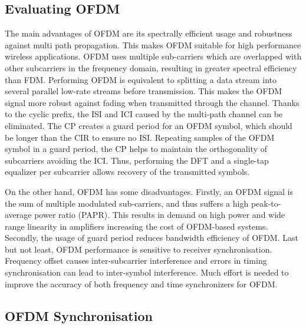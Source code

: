 \subsection{Evaluating OFDM}

The main advantages of OFDM are its spectrally efficient usage and robustness against multi path propagation.
This makes OFDM suitable for high performance wireless applications.
OFDM uses multiple sub-carriers which are overlapped with other subcarriers in the frequency domain, resulting in greater spectral efficiency than FDM.
Performing OFDM is equivalent to splitting a data stream into several parallel low-rate streams before transmission.
This makes the OFDM signal more robust against fading when transmitted through the channel.
Thanks to the cyclic prefix, the ISI and ICI caused by the multi-path channel can be eliminated.
The CP creates a guard period for an OFDM symbol, which should be longer than the CIR to ensure no ISI.
Repeating samples of the OFDM symbol in a guard period, the CP helps to maintain the orthogonality of subcarriers avoiding the ICI.
Thus, performing the DFT and a single-tap equalizer per subcarrier allows recovery of the transmitted symbols.

On the other hand, OFDM has some disadvantages.
Firstly, an OFDM signal is the sum of multiple modulated sub-carriers, and thus suffers a high peak-to-average power ratio (PAPR).
This results in demand on high power and wide range linearity in amplifiers increasing the cost of OFDM-based systems.
Secondly, the usage of guard period reduces bandwidth efficiency of OFDM.
Last but not least, OFDM performance is sensitive to receiver synchronisation. Frequency offset causes inter-subcarrier interference and errors in timing synchronisation can lead to inter-symbol interference.
Much effort is needed to improve the accuracy of both frequency and time synchronizers for OFDM.



\subsection{OFDM Synchronisation}

